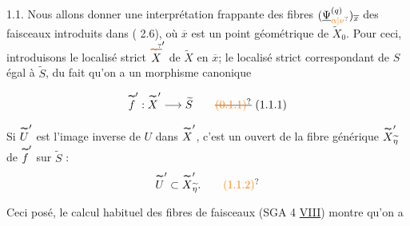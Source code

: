 

1.1. Nous allons donner une interprétation frappante des fibres $(\underline{\Psi}_{\unsure{\alpha|\nu}}^{(q)})_{\overline{x}}$ des faisceaux introduits dans ( 2.6), où $\overline{x}$ est un point géométrique de $\widetilde{X}_0$. Pour ceci, introduisons le localisé strict $\overset{\deleted{\unsure{\sim}}}{X}'$ de $\widetilde{X}$ en $\overline{x}$;  le localisé strict correspondant de $S$ égal à $\widetilde{S}$, du fait qu'on a un morphisme canonique


\[
\overset{\deleted{\sim}}{f}' : \overset{\deleted{\sim}}{X}'\longrightarrow\widetilde{S}
\tag*{\deleted{\unsure{(0.1.1)}} (1.1.1)}
\]

Si $\overset{\deleted{\sim}}{U}'$ est l'image inverse de $U$ dans $\overset{\deleted{\sim}}{X}'$, c'est un ouvert de la fibre générique $\overset{\deleted{\sim}}{X}'_{\widetilde{\eta}}$ de $\overset{\deleted{\sim}}{f}'$ sur $\widetilde{S}$ :
\[
\overset{\deleted{\sim}}{U}'\subset\overset{\deleted{\sim}}{X}'_{\widetilde{\eta}}.
\tag*{\unsure{(1.1.2)}}
\]

Ceci posé, le  calcul habituel des fibres de faisceaux  (SGA 4 \uline{VIII}\quad) montre qu'on a


